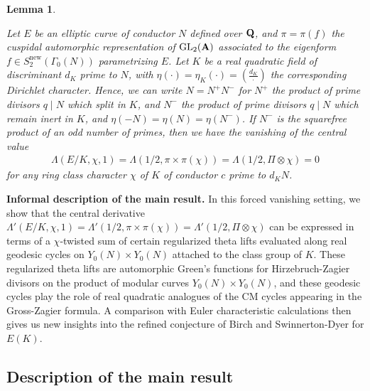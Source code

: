 \documentclass{amsart}
\newtheorem{lemma}[theorem]{Lemma}
\theoremstyle{definition}
\begin{document}
\begin{lemma}\label{key} 

Let $E$ be an elliptic curve of conductor $N$ defined over ${\bf{Q}}$, and $\pi = \pi(f)$ the cuspidal automorphic representation of
$\operatorname{GL}_2({\bf{A}})$ associated to the eigenform $f \in S_2^{\operatorname{new}}(\Gamma_0(N))$ parametrizing $E$.
Let $K$ be a real quadratic field of discriminant $d_K$ prime to $N$, with $\eta (\cdot) = \eta_K (\cdot) = \left( \frac{d_K}{\cdot} \right)$
the corresponding Dirichlet character. Hence, we can write $N = N^+ N^-$ for $N^+$ the product of prime divisors 
$q \mid N$ which split in $K$, and $N^-$ the product of prime divisors $q \mid N$ which remain inert in $K$, and $\eta(-N) = \eta(N) = \eta(N^-)$.
If $N^-$ is the squarefree product of an odd number of primes, then we have the vanishing of the central value
\begin{align*} \Lambda(E/K, \chi, 1) = \Lambda(1/2, \pi \times \pi(\chi)) = \Lambda(1/2, \Pi \otimes \chi) = 0 \end{align*}
for any ring class character $\chi$ of $K$ of conductor $c$ prime to $d_K N$. \end{lemma}

\noindent \textbf{Informal description of the main result.} In this forced vanishing setting, we show that the central derivative
$\Lambda'(E/K,\chi,1) = \Lambda'(1/2, \pi \times \pi(\chi)) = \Lambda'(1/2, \Pi \otimes \chi)$ can be expressed in terms of a $\chi$-twisted sum of
certain regularized theta lifts evaluated along real geodesic cycles on $Y_0(N)\times Y_0(N)$ attached to the class group of $K$.
These regularized theta lifts are automorphic Green's functions for Hirzebruch-Zagier divisors on the product of modular curves $Y_0(N) \times Y_0(N)$,
and these geodesic cycles play the role of real quadratic analogues of the CM cycles appearing in the Gross-Zagier formula. 
A comparison with Euler characteristic calculations then gives us new insights into the refined conjecture of Birch and Swinnerton-Dyer for $E(K)$.

\subsection{Description of the main result}
\end{document}

